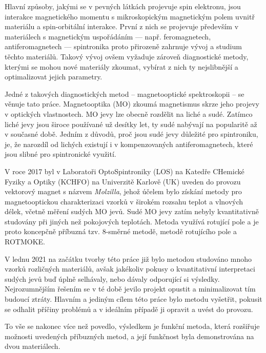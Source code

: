 Hlavní způsoby, jakými se v pevných látkách projevuje spin elektronu, jsou interakce magnetického momentu s mikroskopickým magnetickým polem uvnitř materiálu a spin-orbitální interakce\cita.
První z nich se projevuje především v materiálech s magnetickým uspořádáním --- např. feromagnetech, antiferomagnetech --- spintronika proto přirozeně zahrnuje vývoj a studium těchto materiálů.
Takový vývoj ovšem vyžaduje zároveň diagnostické metody, kterými se mohou nové materiály zkoumat, vybírat z nich ty nejslibnější a optimalizovat jejich parametry.

Jedné z takových diagnostických metod -- magnetooptické spektroskopii -- se věnuje tato práce.
Magnetooptika (MO) zkoumá magnetismus skrze jeho projevy v optických vlastnostech.
MO jevy lze obecně rozdělit na liché a sudé.
Zatímco liché jevy jsou široce používané už desítky let, ty sudé nabývají na popularitě až v současné době.
Jedním z důvodů, proč jsou sudé jevy důležité pro spintroniku, je, že narozdíl od lichých existují i v kompenzovaných antiferomagnetech, které jsou slibné pro spintronické využití.

V roce 2017 byl v Laboratoři OptoSpintroniky (LOS) na Katedře CHemické Fyziky a Optiky (KCHFO) na Univerzitě Karlově (UK) uveden do provozu vektorový magnet s názvem \emph{Molzilla}, jehož účelem bylo získání metody pro magnetooptickou charakterizaci vzorků v širokém rozsahu teplot a vlnových délek, včetně měření sudých MO jevů.
Sudé MO jevy zatím nebyly kvantitativně studovány při jiných než pokojových teplotách.
Metoda využívá rotující pole a je proto koncepčně příbuzná tzv. 8-směrné metodě, metodě rotujícího pole a ROTMOKE.

V lednu 2021 na začátku tvorby této práce již bylo metodou studováno mnoho vzorků rozličných materiálů, avšak jakékoliv pokusy o kvantitativní interpretaci sudých jevů buď úplně selhávaly, nebo dávaly odporující si výsledky.
Nejrozumnějším řešením se v té době jevilo projekt opustit a minimalizovat tím budoucí ztráty.
Hlavním a jediným cílem této práce bylo metodu vyšetřit, pokusit se odhalit příčiny problémů a v ideálním případě ji opravit a uvést do provozu.

To vše se nakonec více než povedlo, výsledkem je funkční metoda, která rozšiřuje možnosti uvedených příbuzných metod, a její funkčnost byla demonstrována na dvou materiálech.
